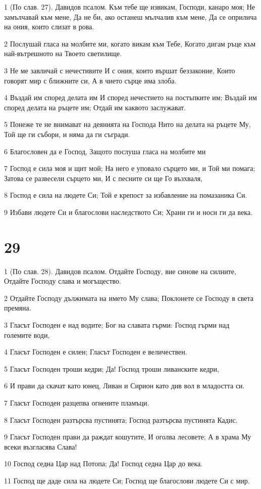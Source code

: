 \par 1 (По слав. 27). Давидов псалом. Към тебе ще извикам, Господи, канаро моя; Не замълчавай към мене, Да не би, ако останеш мълчалив към мене, Да се оприлича на ония, които слизат в рова.
\par 2 Послушай гласа на молбите ми, когато викам към Тебе, Когато дигам ръце към най-вътрешното на Твоето светилище.
\par 3 Не ме завличай с нечестивите И с ония, които вършат беззаконие, Които говорят мир с ближните си, А в чието сърце има злоба.
\par 4 Въздай им според делата им И според нечестието на постъпките им; Въздай им според делата на ръцете им; Отдай им каквото заслужават.
\par 5 Понеже те не внимават на деянията на Господа Нито на делата на ръцете Му, Той ще ги събори, и няма да ги съгради.
\par 6 Благословен да е Господ, Защото послуша гласа на молбите ми
\par 7 Господ е сила моя и щит мой; На него е уповало сърцето ми, и Той ми помага; Затова се развесели сърцето ми, И с песните си ще Го възхваля,
\par 8 Господ е сила на людете Си; Той е крепост за избавление на помазаника Си.
\par 9 Избави людете Си и благослови наследството Си; Храни ги и носи ги да века.

\chapter{29}

\par 1 (По слав. 28). Давидов псалом. Отдайте Господу, вие синове на силните, Отдайте Господу слава и могъщество.
\par 2 Отдайте Господу дължимата на името Му слава; Поклонете се Господу в света премяна.
\par 3 Гласът Господен е над водите; Бог на славата гърми: Господ гърми над големите води,
\par 4 Гласът Господен е силен; Гласът Господен е величествен.
\par 5 Гласът Господен троши кедри; Да! Господ троши ливанските кедри,
\par 6 И прави да скачат като юнец, Ливан и Сирион като див вол в младостта си.
\par 7 Гласът Господен разцепва огнените пламъци.
\par 8 Гласът Господен разтърсва пустинята; Господ разтърсва пустинята Кадис.
\par 9 Гласът Господен прави да раждат кошутите, И оголва лесовете; А в храма Му всеки възгласява Слава!
\par 10 Господ седна Цар над Потопа; Да! Господ седна Цар до века.
\par 11 Господ ще даде сила на людете Си; Господ ще благослови людете Си с мир.

